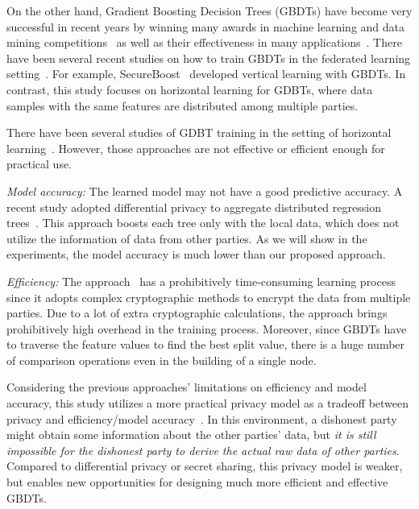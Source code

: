 \documentclass[letterpaper]{article} %
\theoremstyle{definition}
\begin{document}
On the other hand, Gradient Boosting Decision Trees (GBDTs) have become very successful in recent years by winning many awards in machine learning and data mining competitions~\cite{chen2016xgboost} as well as their effectiveness in many applications~\cite{richardson2007predicting,kim2009improving,burges2010ranknet,li2019privacy}. There have been several recent studies on how to train GBDTs in the federated learning setting~\cite{cheng2019secureboost,liu2019boosting,zhao2018inprivate}. For example, SecureBoost~\cite{cheng2019secureboost} developed vertical learning with GBDTs. In contrast, this study focuses on horizontal learning for GDBTs, where data samples with the same features are distributed among multiple parties.


There have been several studies of GDBT training in the setting of horizontal learning~\cite{liu2019boosting,zhao2018inprivate}. However, those approaches are not effective or efficient enough for practical use. 

\emph{Model accuracy:}  The learned model may not have a good predictive accuracy. A recent study adopted differential privacy to aggregate distributed regression trees~\cite{zhao2018inprivate}. This approach boosts each tree only with the local data, which does not utilize the information of data from other parties. As we will show in the experiments, the model accuracy is much lower than our proposed approach.


\emph{Efficiency:} The approach~\cite{liu2019boosting} has a prohibitively time-consuming learning process since it adopts complex cryptographic methods to encrypt the data from multiple parties. Due to a lot of extra cryptographic calculations, the approach brings prohibitively high overhead in the training process. Moreover, since GBDTs have to traverse the feature values to find the best split value, there is a huge number of comparison operations even in the building of a single node. 



Considering the previous approaches' limitations on efficiency and model accuracy, this study utilizes a more practical privacy model as a tradeoff between privacy and efficiency/model accuracy~\cite{du2004privacy,liu2018secure}. In this environment, a dishonest party might obtain some information about the other parties' data, but \emph{it is still impossible for the dishonest party to derive the actual raw data of other parties}. Compared to differential privacy or secret sharing, this privacy model is weaker, but enables new opportunities for designing much more efficient and effective GBDTs. 
\end{document}
